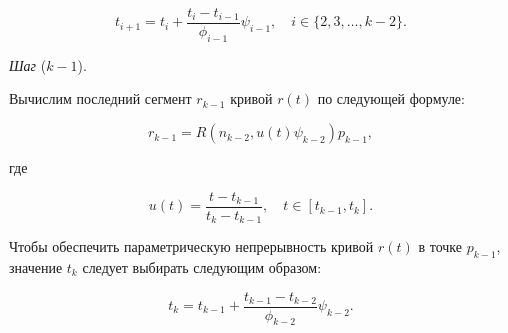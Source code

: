 $$
t_{i+1}=t_i+\frac{t_i-t_{i-1}}{\phi_{i-1}}\psi_{i-1}, \quad i \in \{2,3,\dots,k-2\}.
$$

\bigskip
\textit{Шаг} ($k-1$).

Вычислим последний сегмент $r_{k-1}$ кривой $r(t)$ по следующей формуле:

$$
r_{k-1}=R(n_{k-2},u(t)\psi_{k-2})p_{k-1},
$$

\noindent где

$$
u(t)=\frac{t-t_{k-1}}{t_k-t_{k-1}}, \quad t \in [t_{k-1},t_k].
$$

Чтобы обеспечить параметрическую непрерывность кривой $r(t)$ в точке $p_{k-1}$, значение $t_k$ следует выбирать
следующим образом:

$$
t_k=t_{k-1}+\frac{t_{k-1}-t_{k-2}}{\phi_{k-2}}\psi_{k-2}.
$$
